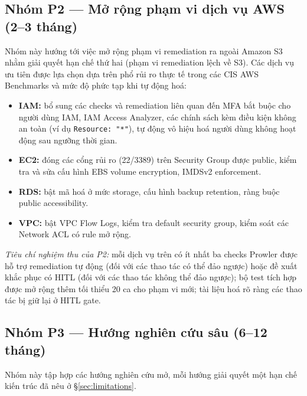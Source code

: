 \subsection{Nhóm P2 --- Mở rộng phạm vi dịch vụ AWS (2--3 tháng)}
\label{subsec:fw-p2}

Nhóm này hướng tới việc mở rộng phạm vi remediation ra ngoài Amazon S3 nhằm giải quyết hạn chế thứ hai (phạm vi remediation lệch về S3). Các dịch vụ ưu tiên được lựa chọn dựa trên phổ rủi ro thực tế trong các CIS AWS Benchmarks và mức độ phức tạp khi tự động hoá:

\begin{itemize}
  \item \textbf{IAM:} bổ sung các checks và remediation liên quan đến MFA bắt buộc cho người dùng IAM, IAM Access Analyzer, các chính sách kèm điều kiện không an toàn (ví dụ \texttt{Resource: "*"}), tự động vô hiệu hoá người dùng không hoạt động sau ngưỡng thời gian.
  \item \textbf{EC2:} đóng các cổng rủi ro (22/3389) trên Security Group được public, kiểm tra và sửa cấu hình EBS volume encryption, IMDSv2 enforcement.
  \item \textbf{RDS:} bật mã hoá ở mức storage, cấu hình backup retention, ràng buộc public accessibility.
  \item \textbf{VPC:} bật VPC Flow Logs, kiểm tra default security group, kiểm soát các Network ACL có rule mở rộng.
\end{itemize}

\noindent\textit{Tiêu chí nghiệm thu của P2:} mỗi dịch vụ trên có ít nhất ba checks Prowler được hỗ trợ remediation tự động (đối với các thao tác có thể đảo ngược) hoặc đề xuất khắc phục có HITL (đối với các thao tác không thể đảo ngược); bộ test tích hợp được mở rộng thêm tối thiểu 20 ca cho phạm vi mới; tài liệu hoá rõ ràng các thao tác bị giữ lại ở HITL gate.

\subsection{Nhóm P3 --- Hướng nghiên cứu sâu (6--12 tháng)}
\label{subsec:fw-p3}

Nhóm này tập hợp các hướng nghiên cứu mở, mỗi hướng giải quyết một hạn chế kiến trúc đã nêu ở §\ref{sec:limitations}.

